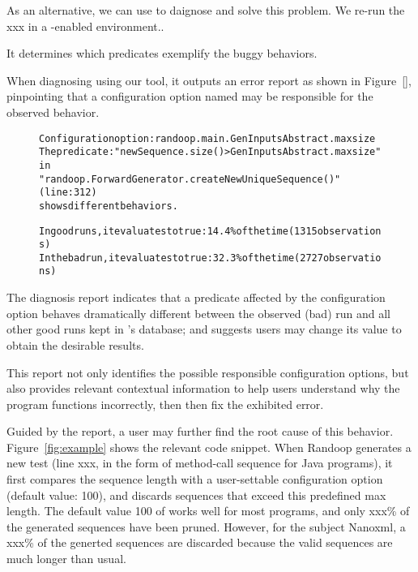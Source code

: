 As an alternative, we can use \ourtool to daignose and solve this problem.
We re-run the xxx in a \ourtool-enabled environment..

It determines which predicates exemplify the buggy behaviors.

When diagnosing using our \ourtool tool, it outputs an error report as
shown in Figure~\ref{}, pinpointing that a configuration option named
 may be responsible for the observed behavior.

\begin{figure}[t]
\begin{CodeOut}
\begin{alltt} 
Configuration option: randoop.main.GenInputsAbstract.maxsize
The predicate: "newSequence.size() > GenInputsAbstract.maxsize" in
"randoop.ForwardGenerator.createNewUniqueSequence()" (line: 312)
shows different behaviors.

In good runs, it evaluates to true:  14.4\% of the time (1315 observations)
In the bad run, it evaluates to true: 32.3\% of the time (2727 observations)

\end{alltt}
\end{CodeOut}
\vspace*{-15pt}
\end{figure}


The diagnosis report indicates that a predicate affected by
the configuration option  behaves dramatically
different between the observed (bad) run and all other good runs
kept in \ourtool's database; and suggests users may change its
value to obtain the desirable results.

This report not only identifies the possible responsible configuration
options, but also provides relevant contextual information to
help users understand why the program functions incorrectly,
then then fix the exhibited error.

Guided by the report, a user may further find the root
cause of this behavior. Figure~\ref{fig:example} shows
the relevant code snippet. When Randoop generates a new
test (line xxx, in the form of method-call sequence for Java programs),
it first compares the sequence length with a user-settable
configuration option  (default value: 100), and
discards sequences that exceed this predefined max length.
The default value 100 of  works well for most
programs, and only xxx\% of the generated sequences have been pruned.
However, for the subject Nanoxml, a xxx\% of the generted sequences
are discarded because the valid sequences are much longer than usual.

